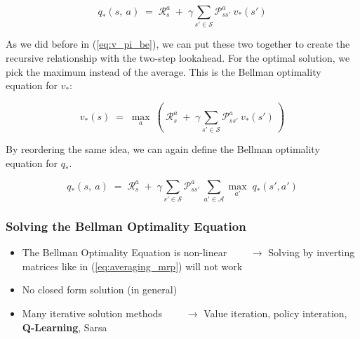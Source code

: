 \documentclass[10pt]{article}
\begin{document}
\begin{equation}
q_{*}(s,\:a)\;=\;\mathcal{R}_{s}^{a}\;+\;\gamma \sum_{s' \in \mathcal{S}} \mathcal{P}_{ss'}^{a}\:v_{*}(s')
\end{equation}

As we did before in (\ref{eq:v_pi_be}), we can put these two together to create the recursive relationship with the two-step lookahead. For the optimal solution, we pick the maximum instead of the average. This is the Bellman optimality equation for $v_{*}$:

\begin{equation}
v_{*}(s)\;=\;\mathop{max}_{a}\: \left( \: \mathcal{R}_{s}^{a}\;+\;\gamma \sum_{s' \in \mathcal{S}} \mathcal{P}_{ss'}^{a}\:v_{*}(s') \: \right)
\end{equation}

By reordering the same idea, we can again define the Bellman optimality equation for $q_{*}$. 

\begin{equation}
q_{*}(s,\:a)\;=\;\mathcal{R}_{s}^{a}\;+\;\gamma \sum_{s' \in \mathcal{S}} \mathcal{P}_{ss'}^{a}\: \sum_{a' \in \mathcal{A}} \mathop{max}_{a'} \; q_{*}(s', a')
\end{equation}

\subsubsection*{Solving the Bellman Optimality Equation}

\begin{itemize}
\item The Bellman Optimality Equation is non-linear \newline
$\qquad \rightarrow$ Solving by inverting matrices like in (\ref{eq:averaging_mrp}) will not work
\item No closed form solution (in general)
\item Many iterative solution methods \newline
$\qquad \rightarrow$ Value iteration, policy interation, \textbf{Q-Learning}, Sarsa
\end{itemize}
\newline 
\end{document}
